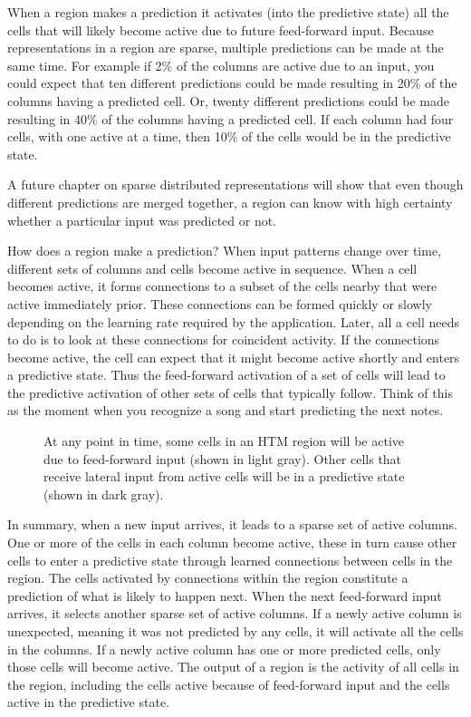 \documentclass{report}
\begin{document}
\begin{enumerate}
When a region makes a prediction it activates (into the predictive
state) all the cells that will likely become active due to future
feed-forward input. Because representations in a region are sparse,
multiple predictions can be made at the same time. For example if 2\%
of the columns are active due to an input, you could expect that ten
different predictions could be made resulting in 20\% of the columns
having a predicted cell. Or, twenty different predictions could be
made resulting in 40\% of the columns having a predicted cell. If each
column had four cells, with one active at a time, then 10\% of the
cells would be in the predictive state.

A future chapter on sparse distributed representations will show that
even though different predictions are merged together, a region can
know with high certainty whether a particular input was predicted or
not.

How does a region make a prediction? When input patterns change over
time, different sets of columns and cells become active in
sequence. When a cell becomes active, it forms connections to a subset
of the cells nearby that were active immediately prior. These
connections can be formed quickly or slowly depending on the learning
rate required by the application. Later, all a cell needs to do is to
look at these connections for coincident activity. If the connections
become active, the cell can expect that it might become active shortly
and enters a predictive state. Thus the feed-forward activation of a
set of cells will lead to the predictive activation of other sets of
cells that typically follow. Think of this as the moment when you
recognize a song and start predicting the next notes.

\begin{figure}
\caption{At any point in time, some cells in an HTM region will be
  active due to feed-forward input (shown in light gray). Other cells
  that receive lateral input from active cells will be in a predictive
  state (shown in dark gray).}
\label{figure:activity-types}
\end{figure}

In summary, when a new input arrives, it leads to a sparse set of
active columns. One or more of the cells in each column become active,
these in turn cause other cells to enter a predictive state through
learned connections between cells in the region. The cells activated
by connections within the region constitute a prediction of what is
likely to happen next. When the next feed-forward input arrives, it
selects another sparse set of active columns. If a newly active column
is unexpected, meaning it was not predicted by any cells, it will
activate all the cells in the columns. If a newly active column has
one or more predicted cells, only those cells will become active. The
output of a region is the activity of all cells in the region,
including the cells active because of feed-forward input and the cells
active in the predictive state.


\end{enumerate}
\end{document}
